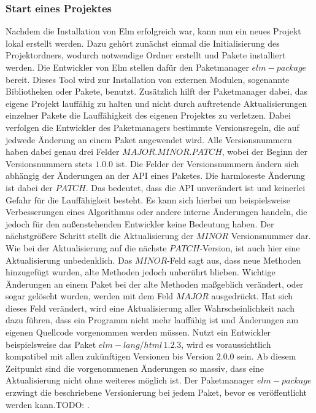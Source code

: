 \subsubsection{Start eines Projektes}
\label{sec:start-eines-projektes}
Nachdem die Installation von Elm erfolgreich war, kann nun ein neues Projekt lokal erstellt werden. Dazu gehört zunächst einmal die Initialisierung des Projektordners, wodurch notwendige Ordner erstellt und Pakete installiert werden. Die Entwickler von Elm stellen dafür den Paketmanager $elm-package$ bereit. Dieses Tool wird zur Installation von externen Modulen, sogenannte Bibliotheken oder Pakete, benutzt. Zusätzlich hilft der Paketmanager dabei, das eigene Projekt lauffähig zu halten und nicht durch auftretende Aktualisierungen einzelner Pakete die Lauffähigkeit des eigenen Projektes zu verletzen. Dabei verfolgen die Entwickler des Paketmanagers bestimmte Versionsregeln, die auf jedwede Änderung an einem Paket angewendet wird. Alle Versionsnummern haben dabei genau drei Felder $MAJOR.MINOR.PATCH$, wobei der Beginn der Versionsnummern stets $1.0.0$ ist. Die Felder der Versionsnummern ändern sich abhängig der Änderungen an der API eines Paketes. Die harmloseste Änderung ist dabei der $PATCH$. Das bedeutet, dass die \ac{API} unverändert ist und keinerlei Gefahr für die Lauffähigkeit besteht. Es kann sich hierbei um beispielsweise Verbesserungen eines Algorithmus oder andere interne Änderungen handeln, die jedoch für den außenstehenden Entwickler keine Bedeutung haben.
Der nächstgrößere Schritt stellt die Aktualisierung der $MINOR$ Versionsnummer dar. Wie bei der Aktualisierung auf die nächste $PATCH$-Version, ist auch hier eine Aktualisierung unbedenklich. Das $MINOR$-Feld sagt aus, dass neue Methoden hinzugefügt wurden, alte Methoden jedoch unberührt blieben.
Wichtige Änderungen an einem Paket bei der alte Methoden maßgeblich verändert, oder sogar gelöscht wurden, werden mit dem Feld $MAJOR$ ausgedrückt. Hat sich dieses Feld verändert, wird eine Aktualisierung aller Wahrscheinlichkeit nach dazu führen, dass ein Programm nicht mehr lauffähig ist und Änderungen am eigenen Quellcode vorgenommen werden müssen.
Nutzt ein Entwickler beispielsweise das Paket $elm-lang/html\,1.2.3$, wird es voraussichtlich kompatibel mit allen zukünftigen Versionen bis Version $2.0.0$ sein. Ab diesem Zeitpunkt sind die vorgenommenen Änderungen so massiv, dass eine Aktualisierung nicht ohne weiteres möglich ist. Der Paketmanager $elm-package$ erzwingt die beschriebene Versionierung bei jedem Paket, bevor es veröffentlicht werden kann.TODO: \cite{https://github.com/elm-lang/elm-package}.

